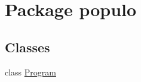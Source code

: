 \hypertarget{namespacepopulo}{\section{Package populo}
\label{namespacepopulo}
}
\subsection*{Classes}
\begin{DoxyCompactItemize}
\item 
class \hyperlink{classpopulo_1_1_program}{Program}
\end{DoxyCompactItemize}
